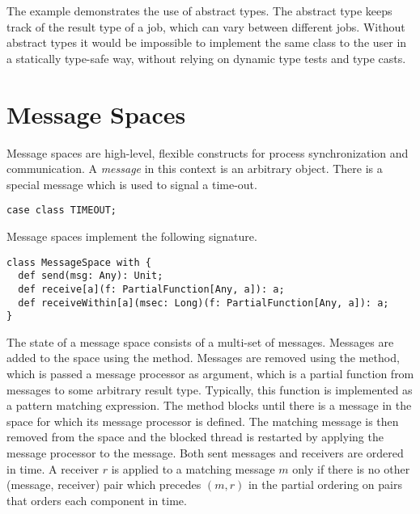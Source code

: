 \documentclass[11pt]{report}
\begin{document}
The example demonstrates the use of abstract types. The abstract type
\verb@t@ keeps track of the result type of a job, which can vary
between different jobs. Without abstract types it would be impossible
to implement the same class to the user in a statically type-safe
way, without relying on dynamic type tests and type casts.

\section{Message Spaces}
\label{sec:messagespace}

Message spaces are high-level, flexible constructs for process
synchronization and communication. A {\em message} in this context is
an arbitrary object.  There is a special message \verb@TIMEOUT@ which
is used to signal a time-out.
\begin{verbatim}
case class TIMEOUT;
\end{verbatim}
Message spaces implement the following signature.
\begin{verbatim}
class MessageSpace with {
  def send(msg: Any): Unit;
  def receive[a](f: PartialFunction[Any, a]): a;
  def receiveWithin[a](msec: Long)(f: PartialFunction[Any, a]): a;
}
\end{verbatim}
The state of a message space consists of a multi-set of messages.
Messages are added to the space using the \verb@send@ method. Messages
are removed using the \verb@receive@ method, which is passed a message
processor \verb@f@ as argument, which is a partial function from
messages to some arbitrary result type. Typically, this function is
implemented as a pattern matching expression. The \verb@receive@
method blocks until there is a message in the space for which its
message processor is defined.  The matching message is then removed
from the space and the blocked thread is restarted by applying the
message processor to the message. Both sent messages and receivers are
ordered in time. A receiver $r$ is applied to a matching message $m$
only if there is no other (message, receiver) pair which precedes $(m,
r)$ in the partial ordering on pairs that orders each component in
time.
\end{document}
